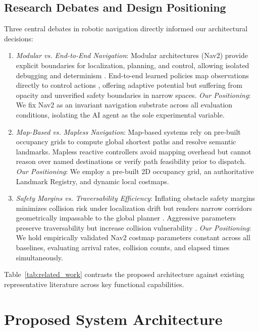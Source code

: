 \documentclass[conference]{IEEEtran}
\begin{document}
\subsection{Research Debates and Design Positioning}
Three central debates in robotic navigation directly informed our architectural decisions:
\begin{enumerate}
    \item \textit{Modular vs. End-to-End Navigation}: Modular architectures (Nav2) provide explicit boundaries for localization, planning, and control, allowing isolated debugging and determinism \cite{Macenski2020marathon2}. End-to-end learned policies map observations directly to control actions \cite{ElHariry2025navbench}, offering adaptive potential but suffering from opacity and unverified safety boundaries in narrow spaces. \textit{Our Positioning}: We fix Nav2 as an invariant navigation substrate across all evaluation conditions, isolating the AI agent as the sole experimental variable.
    \item \textit{Map-Based vs. Mapless Navigation}: Map-based systems rely on pre-built occupancy grids to compute global shortest paths and resolve semantic landmarks. Mapless reactive controllers avoid mapping overhead but cannot reason over named destinations or verify path feasibility prior to dispatch. \textit{Our Positioning}: We employ a pre-built 2D occupancy grid, an authoritative Landmark Registry, and dynamic local costmaps.
    \item \textit{Safety Margins vs. Traversability Efficiency}: Inflating obstacle safety margins minimizes collision risk under localization drift but renders narrow corridors geometrically impassable to the global planner \cite{Nav2TuningGuide}. Aggressive parameters preserve traversability but increase collision vulnerability \cite{Xiao2022barn}. \textit{Our Positioning}: We hold empirically validated Nav2 costmap parameters constant across all baselines, evaluating arrival rates, collision counts, and elapsed times simultaneously.
\end{enumerate}

Table~\ref{tab:related_work} contrasts the proposed architecture against existing representative literature across key functional capabilities.

\section{Proposed System Architecture}
\end{document}
